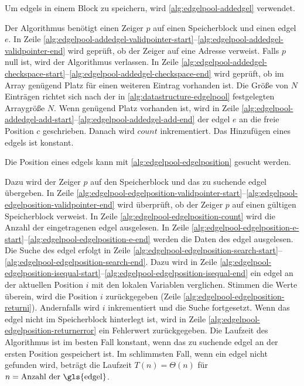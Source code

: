 Um \glspl{edgel} in einem Block zu speichern, wird \autoref{alg:edgelpool-addedgel} verwendet.

Der Algorithmus benötigt einen Zeiger $p$ auf einen Speicherblock und einen \gls{edgel} $e$. In Zeile
 \ref{alg:edgelpool-addedgel-validpointer-start}--\ref{alg:edgelpool-addedgel-validpointer-end} wird geprüft, ob der
 Zeiger auf eine Adresse verweist. Falls $p$ null ist, wird der Algorithmus verlassen. In Zeile
 \ref{alg:edgelpool-addedgel-checkspace-start}--\ref{alg:edgelpool-addedgel-checkspace-end} wird geprüft, ob im Array
 genügend Platz für einen weiteren Eintrag vorhanden ist. Die Größe von $N$ Einträgen richtet sich nach der in
 \autoref{alg:datastructure-edgelpool} festgelegten Arraygröße $N$. Wenn genügend Platz vorhanden ist, wird in Zeile
 \ref{alg:edgelpool-addedgel-add-start}--\ref{alg:edgelpool-addedgel-add-end} der \gls{edgel} $e$ an die freie
 Position $c$ geschrieben. Danach wird $\mathit{count}$ inkrementiert. Das Hinzufügen eines \glspl{edgel} ist konstant.

Die Position eines \glspl{edgel} kann mit \autoref{alg:edgelpool-edgelposition} gesucht werden.

Dazu wird der Zeiger $p$ auf den Speicherblock und das zu suchende \gls{edgel} übergeben. In Zeile
 \ref{alg:edgelpool-edgelposition-validpointer-start}--\ref{alg:edgelpool-edgelposition-validpointer-end} wird
 überprüft, ob der Zeiger $p$ auf einen gültigen Speicherblock verweist. In Zeile
 \ref{alg:edgelpool-edgelposition-count} wird die Anzahl der eingetragenen \gls{edgel} ausgelesen. In Zeile
 \ref{alg:edgelpool-edgelposition-e-start}--\ref{alg:edgelpool-edgelposition-e-end} werden die Daten des \gls{edgel}
 ausgelesen. Die Suche des \gls{edgel} erfolgt in Zeile
 \ref{alg:edgelpool-edgelposition-search-start}--\ref{alg:edgelpool-edgelposition-search-end}. Dazu wird in Zeile
 \ref{alg:edgelpool-edgelposition-isequal-start}--\ref{alg:edgelpool-edgelposition-isequal-end} ein \gls{edgel} an der
 aktuellen Position $i$ mit den lokalen Variablen verglichen. Stimmen die Werte überein, wird die Position $i$
 zurückgegeben (Zeile \ref{alg:edgelpool-edgelposition-returni}). Andernfalls wird $i$ inkrementiert und die Suche
 fortgesetzt. Wenn das \gls{edgel} nicht im Speicherblock hinterlegt ist, wird in Zeile
 \ref{alg:edgelpool-edgelposition-returnerror} ein Fehlerwert zurückgegeben. Die Laufzeit des Algorithmus ist im besten
 Fall konstant, wenn das zu suchende \gls{edgel} an der ersten Position gespeichert ist. Im schlimmsten Fall, wenn ein
 \gls{edgel} nicht gefunden wird, beträgt die Laufzeit $T(n) = \Theta{(n)}$ für $n = \text{Anzahl der \gls{edgel}}$.


